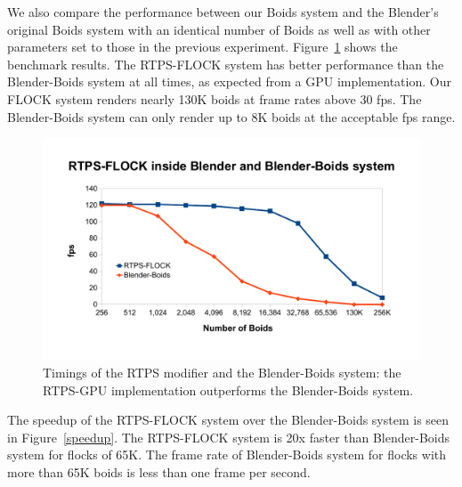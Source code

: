We also compare the performance between our Boids system and the Blender's original Boids system with an identical number of Boids as well as with other parameters set to those in the previous experiment. Figure~\ref{RTPSvsBlender} shows the benchmark results. The RTPS-FLOCK system has better performance than the Blender-Boids system at all times, as expected from a GPU implementation. Our FLOCK system renders nearly 130K boids at frame rates above 30 fps. The Blender-Boids system can only render up to 8K boids at the acceptable fps range.

\begin{figure}[htbp]
\begin{center}
\includegraphics[scale=0.7]{figures/benchmarks.pdf}
\caption{Timings of the RTPS modifier and the Blender-Boids system: the RTPS-GPU implementation outperforms the Blender-Boids system.}
\label{RTPSvsBlender}
\end{center}
\end{figure}

The speedup of the RTPS-FLOCK system over the Blender-Boids system is seen in Figure~\ref{speedup}. The RTPS-FLOCK system is 20x faster than Blender-Boids system for flocks of 65K. The frame rate of Blender-Boids system for flocks with more than 65K boids is less than one frame per second.

